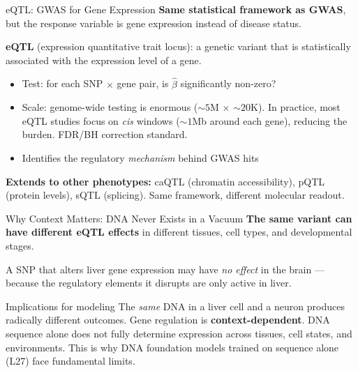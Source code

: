 \documentclass[aspectratio=169,10pt]{beamer}
\begin{document}
\begin{frame}{eQTL: GWAS for Gene Expression}
\textbf{Same statistical framework as GWAS}, but the response variable is gene expression instead of disease status.

\vspace{0.3em}
\textbf{eQTL} (expression quantitative trait locus): a genetic variant that is statistically associated with the expression level of a gene.

\vspace{0.3em}
\begin{itemize}[<+->]
    \item Test: for each SNP $\times$ gene pair, is $\hat{\beta}$ significantly non-zero?
    \item Scale: genome-wide testing is enormous (${\sim}5$M $\times$ ${\sim}20$K). In practice, most eQTL studies focus on \emph{cis} windows (${\sim}1$Mb around each gene), reducing the burden. FDR/BH correction standard.
    \item Identifies the regulatory \emph{mechanism} behind GWAS hits
\end{itemize}

\vspace{0.3em}
\textbf{Extends to other phenotypes:} caQTL (chromatin accessibility), pQTL (protein levels), sQTL (splicing). Same framework, different molecular readout.
\end{frame}

\begin{frame}{Why Context Matters: DNA Never Exists in a Vacuum}
\textbf{The same variant can have different eQTL effects} in different tissues, cell types, and developmental stages.

\vspace{0.3em}
A SNP that alters liver gene expression may have \emph{no effect} in the brain --- because the regulatory elements it disrupts are only active in liver.

\vspace{0.3em}
\begin{block}{Implications for modeling}
The \emph{same} DNA in a liver cell and a neuron produces radically different outcomes. Gene regulation is \textbf{context-dependent}. DNA sequence alone does not fully determine expression across tissues, cell states, and environments. This is why DNA foundation models trained on sequence alone (L27) face fundamental limits.
\end{block}
\end{frame}
\end{document}
